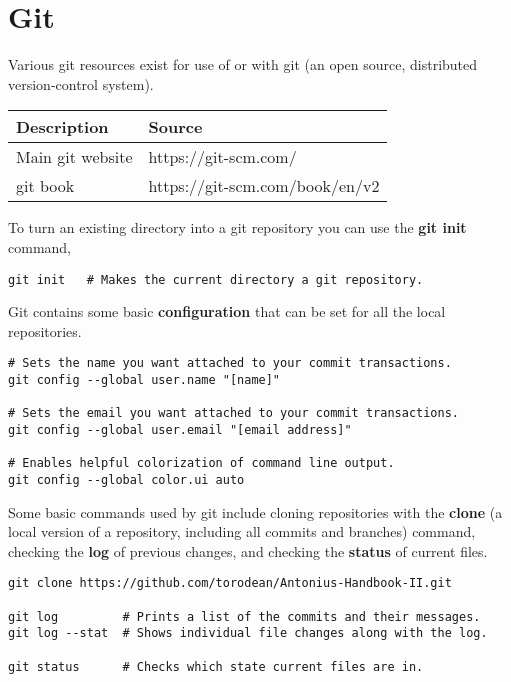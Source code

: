 \chapter{Git}
\thispagestyle{fancy}
\lstset{language=Bash, style=bash}

\begin{fancybox}{}	
	Various git resources exist for use of or with git (an open source, distributed version-control system).
	\begin{center}
		\begin{tabular}{l|l}
			Description & Source \\
			\hline
			Main git website & https://git-scm.com/ \\
			git book & https://git-scm.com/book/en/v2
		\end{tabular}
	\end{center}
\end{fancybox}

To turn an existing directory into a git repository you can use the \textbf{git init} command,
\begin{lstlisting}
git init   # Makes the current directory a git repository.
\end{lstlisting}

Git contains some basic \textbf{configuration} that can be set for all the local repositories.
\begin{lstlisting}
# Sets the name you want attached to your commit transactions.
git config --global user.name "[name]"

# Sets the email you want attached to your commit transactions.
git config --global user.email "[email address]"

# Enables helpful colorization of command line output.
git config --global color.ui auto
\end{lstlisting}

Some basic commands used by git include cloning repositories with the \textbf{clone} (a local version of a repository, including all commits and branches) command, checking the \textbf{log} of previous changes, and checking the \textbf{status} of current files.
\begin{lstlisting}
git clone https://github.com/torodean/Antonius-Handbook-II.git

git log         # Prints a list of the commits and their messages.
git log --stat  # Shows individual file changes along with the log.

git status      # Checks which state current files are in.
\end{lstlisting}

